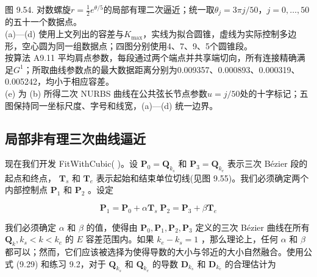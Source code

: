 \documentclass[../main.tex]{subfiles}
\begin{document}
\begin{center}
\begin{minipage}{34cm}
\vspace*{.6\baselineskip}
\centering
{}\par\smallskip
{}\par\smallskip
{}
\par\smallskip
图 9.54. 对数螺旋$r=\tfrac12 e^{\theta/5}$的局部有理二次逼近；统一取$\theta_j=3\pi j/50$，$j=0,\ldots,50$的五十一个数据点。\\
(a)—(d) 使用上文列出的容差与$K_{\max}$，实线为拟合圆锥，虚线为实际控制多边形，空心圆为同一组数据点；四图分别使用4、7、9、5个圆锥段。\\
按算法 A9.11 平均肩点参数，每段通过两个端点并共享端切向，所有连接精确满足$G^1$；所取曲线参数点的最大数据距离分别为0.009357、0.000893、0.000319、0.005242，均小于相应容差。\\
(e) 为 (b) 所得二次 NURBS 曲线在公共弦长节点参数$u=j/50$处的十字标记；五图保持同一坐标尺度、字号和线宽，(a)—(d) 统一边界。
\end{minipage}
\end{center}

\subsection{局部非有理三次曲线逼近}

现在我们开发 FitWithCubic(   )。设 \({\mathbf{P}}_{0} = {\mathbf{Q}}_{{k}_{s}}\) 和 \({\mathbf{P}}_{3} = {\mathbf{Q}}_{{k}_{e}}\) 表示三次 Bézier 段的起点和终点， \({\mathbf{T}}_{s}\) 和 \({\mathbf{T}}_{e}\) 表示起始和结束单位切线(见图 9.55)。我们必须确定两个内部控制点 \({\mathbf{P}}_{1}\) 和 \({\mathbf{P}}_{2}\) 。设定

\[
{\mathbf{P}}_{1} = {\mathbf{P}}_{0} + \alpha {\mathbf{T}}_{s}\;{\mathbf{P}}_{2} = {\mathbf{P}}_{3} + \beta {\mathbf{T}}_{e}
\]

我们必须确定 \(\alpha\) 和 \(\beta\) 的值，使得由 \({\mathbf{P}}_{0},{\mathbf{P}}_{1},{\mathbf{P}}_{2},{\mathbf{P}}_{3}\) 定义的三次 Bézier 曲线在所有 \({\mathbf{Q}}_{k},{k}_{s} < k < {k}_{e}\) 的 \(E\) 容差范围内。如果 \({k}_{e} - {k}_{s} = 1\) ，那么理论上，任何 \(\alpha\) 和 \(\beta\) 都可以；然而，它们应该被选择为使得导数的大小与邻近的大小自然融合。使用公式 (9.29) 和练习 9.2，对于 \({\mathbf{Q}}_{{k}_{s}}\) 和 \({\mathbf{Q}}_{{k}_{e}}\) 的导数 \({\mathbf{D}}_{{k}_{s}}\) 和 \({\mathbf{D}}_{{k}_{e}}\) 的合理估计为
\end{document}
